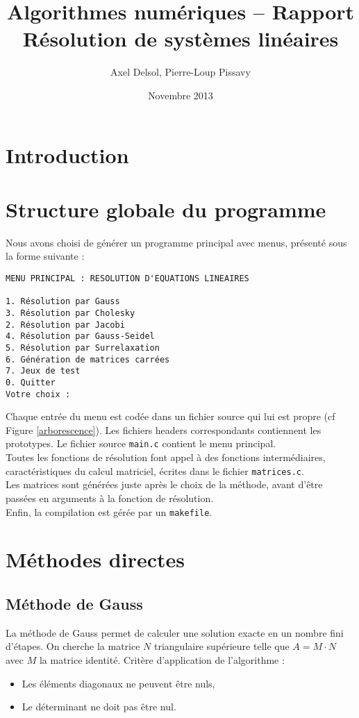 \documentclass{report}
\title{Algorithmes numériques -- Rapport \\ \vspace{0.5cm}Résolution de systèmes linéaires}
\author{Axel Delsol, Pierre-Loup Pissavy}
\date{Novembre 2013}
\begin{document}
  \maketitle
  \tableofcontents

  \chapter*{Introduction}
    \lipsum[1-5]
  \chapter{Structure globale du programme}
    Nous avons choisi de générer un programme principal avec menus, présenté sous la forme suivante :

    \begin{lstlisting}[style=apercu, name=Menu Principal]
MENU PRINCIPAL : RESOLUTION D'EQUATIONS LINEAIRES

1. Résolution par Gauss
3. Résolution par Cholesky
2. Résolution par Jacobi
4. Résolution par Gauss-Seidel
5. Résolution par Surrelaxation
6. Génération de matrices carrées
7. Jeux de test
0. Quitter
Votre choix : 
	\end{lstlisting}
	
	Chaque entrée du menu est codée dans un fichier source qui lui est propre (cf Figure \ref{arborescence}). Les fichiers headers correspondants contiennent les prototypes. Le fichier source \verb"main.c" contient le menu principal.\\
	
	Toutes les fonctions de résolution font appel à des fonctions intermédiaires, caractéristiques du calcul matriciel, écrites dans le fichier \verb"matrices.c".\\
	
    

    Les matrices sont générées juste après le choix de la méthode, avant d'être passées en arguments à la fonction de résolution.\\

	Enfin, la compilation est gérée par un \verb"makefile".     
  \chapter{Méthodes directes}
    \section{Méthode de Gauss}
      La méthode de Gauss permet de calculer une solution exacte en un nombre fini d'étapes.
      \newline
      On cherche la matrice $N$ triangulaire supérieure telle que $A = M \cdot N$ avec $M$ la matrice identité.
      \newline
      Critère d'application de l'algorithme :
      \begin{itemize}
        \item{Les éléments diagonaux ne peuvent être nuls,}
        \item{Le déterminant ne doit pas être nul.}
      \end{itemize}
        \lstset{language=C,showstringspaces=false}
\end{document}
